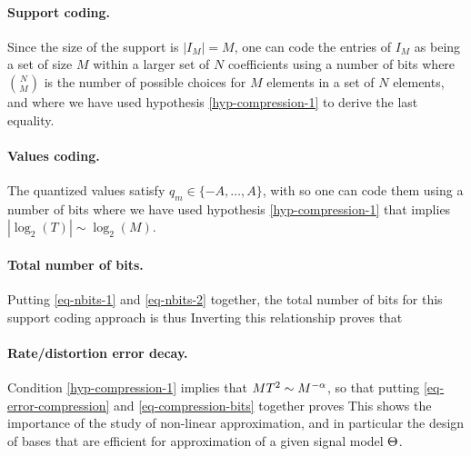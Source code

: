 \paragraph{Support coding.}

Since the size of the support is $|I_M|=M$, one can code the entries of $I_M$ as being a set of size $M$ within a larger set of $N$ coefficients using a number of bits
where ${  N \choose M }$ is the number of possible choices for $M$ elements in a set of $N$ elements, and where we have used hypothesis \eqref{hyp-compression-1} to derive the last equality.

\paragraph{Values coding.}

The quantized values satisfy $q_m \in \{-A,\ldots,A\}$, with 
so one can code them using a number of bits 
where we have used hypothesis \eqref{hyp-compression-1} that implies $|\log_2(T)| \sim \log_2(M)$.

\paragraph{Total number of bits.}

Putting \eqref{eq-nbits-1} and \eqref{eq-nbits-2} together, the total number of bits for this support coding approach is thus
Inverting this relationship proves that 

\paragraph{Rate/distortion error decay.}

Condition \eqref{hyp-compression-1} implies that $M T^2 \sim M^{-\alpha}$, so that putting \eqref{eq-error-compression} and \eqref{eq-compression-bits} together proves
This shows the importance of the study of non-linear approximation, and in particular the design of bases that are efficient for approximation of a given signal model $\Theta$.


